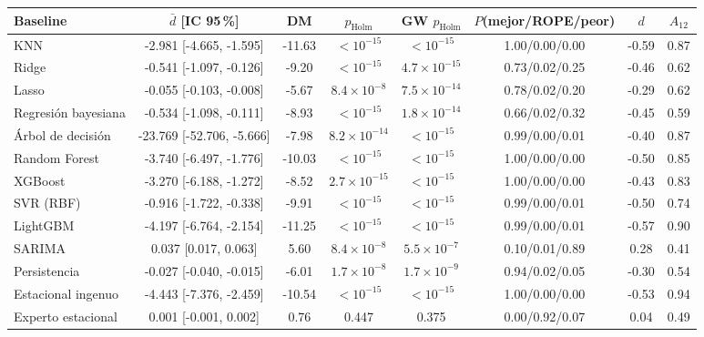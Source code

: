 \begin{tabular}{lccccccc}
\toprule
Baseline & $\bar d$ [IC 95\,\%] & DM & $p_{\mathrm{Holm}}$ & GW $p_{\mathrm{Holm}}$ & $P$(mejor/ROPE/peor) & $d$ & $A_{12}$ \\
\midrule
KNN & -2.981 [-4.665, -1.595] & -11.63 & $<10^{-15}$ & $<10^{-15}$ & 1.00/0.00/0.00 & -0.59 & 0.87 \\
Ridge & -0.541 [-1.097, -0.126] & -9.20 & $<10^{-15}$ & $4.7\times10^{-15}$ & 0.73/0.02/0.25 & -0.46 & 0.62 \\
Lasso & -0.055 [-0.103, -0.008] & -5.67 & $8.4\times10^{-8}$ & $7.5\times10^{-14}$ & 0.78/0.02/0.20 & -0.29 & 0.62 \\
Regresión bayesiana & -0.534 [-1.098, -0.111] & -8.93 & $<10^{-15}$ & $1.8\times10^{-14}$ & 0.66/0.02/0.32 & -0.45 & 0.59 \\
Árbol de decisión & -23.769 [-52.706, -5.666] & -7.98 & $8.2\times10^{-14}$ & $<10^{-15}$ & 0.99/0.00/0.01 & -0.40 & 0.87 \\
Random Forest & -3.740 [-6.497, -1.776] & -10.03 & $<10^{-15}$ & $<10^{-15}$ & 1.00/0.00/0.00 & -0.50 & 0.85 \\
XGBoost & -3.270 [-6.188, -1.272] & -8.52 & $2.7\times10^{-15}$ & $<10^{-15}$ & 1.00/0.00/0.00 & -0.43 & 0.83 \\
SVR (RBF) & -0.916 [-1.722, -0.338] & -9.91 & $<10^{-15}$ & $<10^{-15}$ & 0.99/0.00/0.01 & -0.50 & 0.74 \\
LightGBM & -4.197 [-6.764, -2.154] & -11.25 & $<10^{-15}$ & $<10^{-15}$ & 0.99/0.00/0.01 & -0.57 & 0.90 \\
SARIMA & 0.037 [0.017, 0.063] & 5.60 & $8.4\times10^{-8}$ & $5.5\times10^{-7}$ & 0.10/0.01/0.89 & 0.28 & 0.41 \\
Persistencia & -0.027 [-0.040, -0.015] & -6.01 & $1.7\times10^{-8}$ & $1.7\times10^{-9}$ & 0.94/0.02/0.05 & -0.30 & 0.54 \\
Estacional ingenuo & -4.443 [-7.376, -2.459] & -10.54 & $<10^{-15}$ & $<10^{-15}$ & 1.00/0.00/0.00 & -0.53 & 0.94 \\
Experto estacional & 0.001 [-0.001, 0.002] & 0.76 & 0.447 & 0.375 & 0.00/0.92/0.07 & 0.04 & 0.49 \\
\bottomrule
\end{tabular}